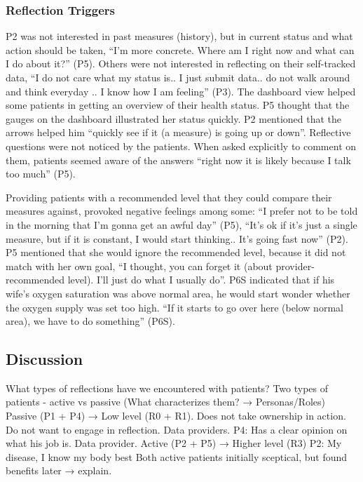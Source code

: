 \subsubsection{Reflection Triggers}
P2 was not interested in past measures (history), but in current status and what action should be taken, “I’m more concrete. Where am I right now and what can I do about it?” (P5). Others were not interested in reflecting on their self-tracked data, “I do not care what my status is.. I just submit data.. do not walk around and think everyday .. I know how I am feeling” (P3).  The dashboard view helped some patients in getting an overview of their health status. P5 thought that the gauges on the dashboard illustrated her status quickly. P2 mentioned that the arrows helped him “quickly see if it (a measure) is going up or down”. Reflective questions were not noticed by the patients. When asked explicitly to comment on them, patients seemed aware of the answers “right now it is likely because I talk too much” (P5). 

Providing patients with a recommended level that they could compare their measures against, provoked negative feelings among some: “I prefer not to be told in the morning that I’m gonna get an awful day” (P5), “It’s ok if it’s just a single measure, but if it is constant, I would start thinking.. It’s going fast now” (P2). P5 mentioned that she would ignore the recommended level, because it did not match with her own goal, “I thought, you can forget it (about provider-recommended level). I’ll just do what I usually do”. P6S indicated that if his wife’s oxygen saturation was above normal area, he would start wonder whether the oxygen supply was set too high. “If it starts to go over here (below normal area), we have to do something” (P6S). 



\subsection{Discussion}

What types of reflections have we encountered with patients?
Two types of patients - active vs passive (What characterizes them? → Personas/Roles)
Passive (P1 + P4) → Low level (R0 + R1). Does not take ownership in action. Do not want to engage in reflection. Data providers.
P4: Has a clear opinion on what his job is. Data provider.
Active (P2 + P5) → Higher level (R3)
P2: My disease, I know my body best
Both active patients initially sceptical, but found benefits later → explain.

